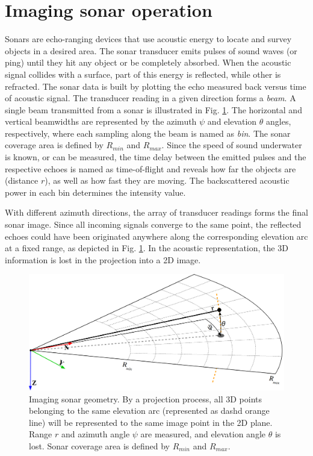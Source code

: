 \documentclass[final,5p,times]{elsarticle}
\begin{document}

\section{Imaging sonar operation}
\label{sonar:operation}

Sonars are echo-ranging devices that use acoustic energy to locate and survey
objects in a desired area. The sonar transducer emits pulses of sound waves
(or ping) until they hit any object or be completely absorbed. When the
acoustic signal collides with a surface, part of this energy is reflected,
while other is refracted. The sonar data is built by plotting the echo measured back versus time of acoustic signal. The transducer reading in a given direction forms a \textit{beam}. A single beam transmitted from a sonar is illustrated in Fig. \ref{fig:sonar_geometry}. The horizontal and vertical beamwidths are represented by the azimuth $\psi$ and elevation $\theta$ angles, respectively, where each sampling along the beam is named as \textit{bin}. The sonar coverage area is defined by $R_{min}$ and $R_{max}$. Since the speed of sound underwater is known, or can be measured, the time delay between the emitted pulses and the respective echoes is named as time-of-flight and reveals how far the objects are (distance $r$), as well as how fast they are moving. The backscattered acoustic power in each bin determines the intensity value.

With different azimuth directions, the array of transducer readings forms the
final sonar image. Since all incoming signals converge to the same point, the
reflected echoes could have been originated anywhere along the corresponding
elevation arc at a fixed range, as depicted in Fig. \ref{fig:sonar_geometry}.
In the acoustic representation, the 3D information is lost in the projection
into a 2D image.

\begin{figure}[t]
    \includegraphics[width=\columnwidth]{figs/sonar_geometry_2}
    \captionsetup{justification=justified}
    \caption{Imaging sonar geometry. By a projection process, all 3D points  belonging to the same elevation arc (represented as dashd orange line) will be represented to the same image point in the 2D plane. Range $r$ and azimuth angle $\psi$ are measured, and elevation angle $\theta$ is lost. Sonar coverage area is defined by $R_{min}$ and $R_{max}$.}
    \label{fig:sonar_geometry}
\end{figure}
\end{document}
